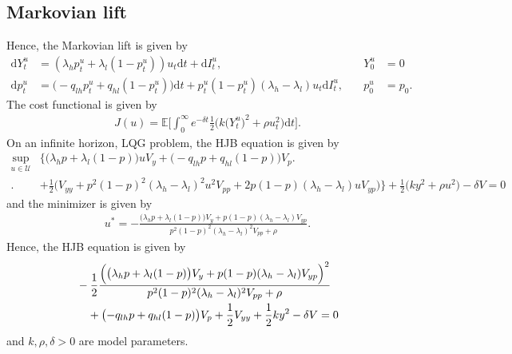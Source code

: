 \documentclass[10pt]{article}
\numberwithin{equation}{part}
\newcommand{\E}{\mathbb{E}}
\newcommand{\cU}{\mathcal{U}}
\newcommand{\rd}{\mathrm{d}}
\theoremstyle{plain}
\theoremstyle{definition}
\begin{document}
\subsection{Markovian lift}
Hence, the Markovian lift is given by
\begin{align*}
    \rd Y^{u}_{t} &= (\lambda_{h}p^{u}_{t} + \lambda_{l}(1 - p^{u}_{t})) u_{t} \rd t + \rd I^{u}_{t},&
    \quad Y^{u}_{0} &= 0 \\ 
    \rd p^{u}_{t} &= \bigl(-q_{lh} p^{u}_{t} + q_{hl} (1 - p^{u}_{t})\bigr) \rd t
    + p^{u}_{t}(1 - p^{u}_{t})(\lambda_{h} - \lambda_{l}) u_{t} \rd I^{u}_{t},&
    \quad p^{u}_{0} &= p_{0}.
\end{align*}
The cost functional is given by
\begin{align*}
    J(u) = \E\biggl[\int_{0}^{\infty} e^{-\delta t}
    \frac{1}{2} \biggl(k \bigl(Y^{u}_{t}\bigr)^{2} + \rho u_{t}^{2}\biggr) \rd t\biggr].
\end{align*}
On an infinite horizon, LQG problem, the HJB equation is given by
\begin{align*}
    \sup_{u\in\cU}&\biggl\{
    \bigl(\lambda_{h}p + \lambda_{l}(1 - p)\bigr)u V_{y} 
    + \bigl(-q_{lh} p + q_{hl} (1 - p)\bigr)V_{p}\biggr.\\
    \biggl.&+ \frac{1}{2}\bigl( V_{yy} 
    + p^{2}(1 - p)^{2}(\lambda_{h} - \lambda_{l})^{2}u^{2}V_{pp}
    + 2 p(1 - p)(\lambda_{h} - \lambda_{l})uV_{yp} \bigr)\biggr\}
    + \frac{1}{2}\bigl( k y^{2} + \rho u^{2}\bigr)
    - \delta V = 0
\end{align*}
and the minimizer is given by
\begin{align*}
    u^{*} = -\frac{\bigl(\lambda_{h}p + \lambda_{l}(1 - p)\bigr)V_{y} 
    + p(1 - p)(\lambda_{h} - \lambda_{l})V_{yp}}{p^{2}(1 - p)^{2}(\lambda_{h} - \lambda_{l})^{2}V_{pp} + \rho}.
\end{align*}
Hence, the HJB equation is given by
\begin{align*}
    &-\frac{1}{2}\frac{\Bigl(\bigl(\lambda_{h}p + \lambda_{l}(1 - p)\bigr)V_{y} 
    + p(1 - p)(\lambda_{h} - \lambda_{l})V_{yp}\Bigr)^{2}}{p^{2}(1 - p)^{2}(\lambda_{h} - \lambda_{l})^{2}V_{pp} + \rho}\\
    &\quad + \bigl(-q_{lh} p + q_{hl} (1 - p)\bigr)V_{p}
    + \frac{1}{2} V_{yy}
    + \frac{1}{2} k y^{2}
    - \delta V = 0
\end{align*}
and $k, \rho, \delta > 0$ are model parameters.
\end{document}
